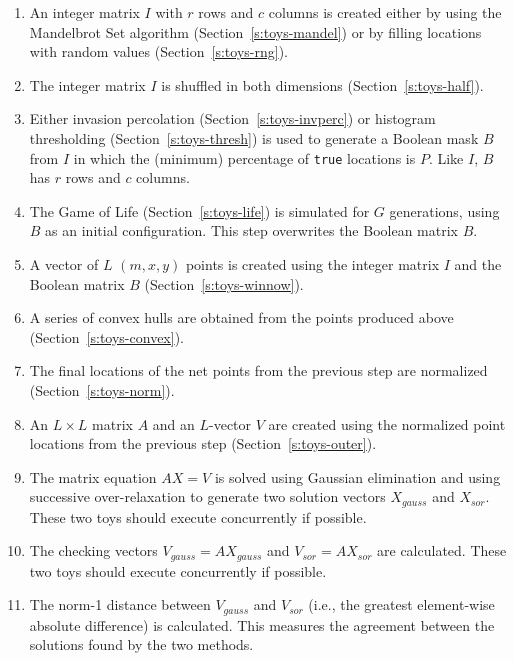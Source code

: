 \begin{enumerate}

\item	An integer matrix $I$ with $r$ rows and $c$ columns is created
	either by using the Mandelbrot Set algorithm (Section~\ref{s:toys-mandel})
	or by filling locations with random values (Section~\ref{s:toys-rng}).
	\label{e:chain-choice-1}

\item	The integer matrix $I$ is shuffled in both dimensions (Section~\ref{s:toys-half}).

\item	Either invasion percolation (Section~\ref{s:toys-invperc}) or histogram thresholding (Section~\ref{s:toys-thresh}) is used
	to generate a Boolean mask $B$ from $I$ in which the (minimum) percentage of {\tt{true}} locations is $P$.
	Like $I$, $B$ has $r$ rows and $c$ columns.
	\label{e:chain-choice-2}

\item	The Game of Life (Section~\ref{s:toys-life}) is simulated for $G$ generations, using $B$ as an initial configuration.
	This step overwrites the Boolean matrix $B$.

\item	A vector of $L$ $(m,x,y)$ points is created using the integer matrix $I$ and the Boolean matrix $B$ (Section~\ref{s:toys-winnow}).

\item	A series of convex hulls are obtained from the points produced above (Section~\ref{s:toys-convex}).

\item	The final locations of the net points from the previous step are normalized (Section~\ref{s:toys-norm}).

\item	An $L{\times}L$ matrix $A$ and an $L$-vector $V$ are created using the normalized point locations from the previous step
	(Section~\ref{s:toys-outer}).

\item	The matrix equation $AX=V$ is solved using Gaussian elimination and using successive over-relaxation
	to generate two solution vectors $X_{gauss}$ and $X_{sor}$.
	These two toys should execute concurrently if possible.

\item	The checking vectors $V_{gauss}=AX_{gauss}$ and $V_{sor}=AX_{sor}$ are calculated.
	These two toys should execute concurrently if possible.

\item	The norm-1 distance between $V_{gauss}$ and $V_{sor}$ (i.e., the greatest element-wise absolute difference) is calculated.
	This measures the agreement between the solutions found by the two methods.

\end{enumerate}

